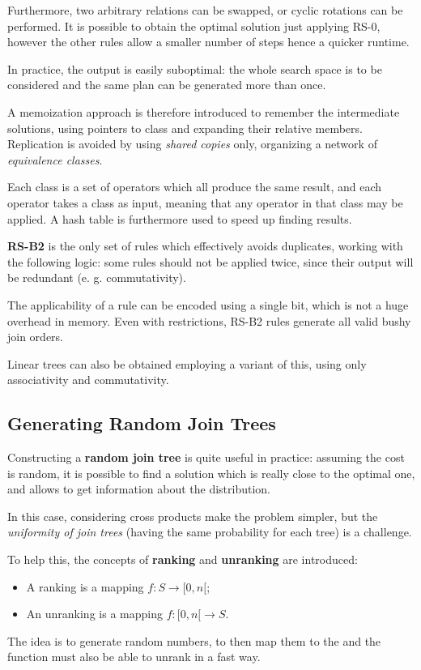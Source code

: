 Furthermore, two arbitrary relations can be swapped, or cyclic rotations can be performed. It is possible to obtain the optimal solution just applying RS-0, however the other rules allow a smaller number of steps hence a quicker runtime.

In practice, the output is easily suboptimal: the whole search space is to be considered and the same plan can be generated more than once. 

A memoization approach is therefore introduced to remember the intermediate solutions, using pointers to class and expanding their relative members. Replication is avoided by using \textit{shared copies} only, organizing a network of \textit{equivalence classes}.

Each class is a set of operators which all produce the same result, and each operator takes a class as input, meaning that any operator in that class may be applied. A hash table is furthermore used to speed up finding results.

\textbf{RS-B2} is the only set of rules which effectively avoids duplicates, working with the following logic: some rules should not be applied twice, since their output will be redundant (e. g. commutativity).

The applicability of a rule can be encoded using a single bit, which is not a huge overhead in memory. Even with restrictions, RS-B2 rules generate all valid bushy join orders.

Linear trees can also be obtained employing a variant of this, using only associativity and commutativity.

\subsection{Generating Random Join Trees}
Constructing a \textbf{random join tree} is quite useful in practice: assuming the cost is random, it is possible to find a solution which is really close to the optimal one, and allows to get information about the distribution.

In this case, considering cross products make the problem simpler, but the \textit{uniformity of join trees} (having the same probability for each tree) is a challenge.

To help this, the concepts of \textbf{ranking} and \textbf{unranking} are introduced:
\begin{itemize}
	\item A ranking is a mapping $f : S \rightarrow [0, n[$;
	\item An unranking is a mapping $f : [0, n[ \rightarrow S$.
\end{itemize}
The idea is to generate random numbers, to then map them to the and the function must also be able to unrank in a fast way.

